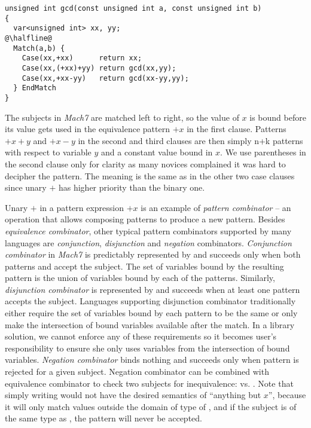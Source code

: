 \begin{lstlisting}[keepspaces,columns=flexible]
unsigned int gcd(const unsigned int a, const unsigned int b)
{
  var<unsigned int> xx, yy;
@\halfline@
  Match(a,b) {
    Case(xx,+xx)      return xx;
    Case(xx,(+xx)+yy) return gcd(xx,yy);
    Case(xx,+xx-yy)   return gcd(xx-yy,yy);
  } EndMatch
}
\end{lstlisting}

\noindent
The subjects in \emph{Mach7} are matched left to right, so the value of $x$ is 
bound before its value gets used in the equivalence pattern $+x$ in the first 
clause. Patterns $+x+y$ and $+x-y$ in the second and third clauses are then 
simply n+k patterns with respect to variable $y$ and a constant value bound in 
$x$. We use parentheses in the second clause only for clarity as many novices 
complained it was hard to decipher the pattern. The meaning is the same as in 
the other two case clauses since unary $+$ has higher priority than the binary 
one.

Unary $+$ in a pattern expression $+x$ is an example of \emph{pattern combinator} 
-- an operation that allows composing patterns to produce a new pattern. 
Besides \emph{equivalence combinator}, other typical pattern combinators 
supported by many languages are \emph{conjunction}, \emph{disjunction} and 
\emph{negation} combinators. \emph{Conjunction combinator} in \emph{Mach7} is 
predictably represented by  and succeeds only when both patterns 
 and  accept the subject. The set of variables bound by the 
resulting pattern is the union of variables bound by each of the patterns. 
Similarly, \emph{disjunction combinator} is represented by  and 
succeeds when at least one pattern accepts the subject. Languages supporting 
disjunction combinator traditionally either require the set of variables bound 
by each pattern to be the same or only make the intersection of bound variables 
available after the match. In a library solution, we cannot enforce any of these 
requirements so it becomes user's responsibility to ensure she only uses 
variables from the intersection of bound variables. \emph{Negation combinator} 
 binds nothing and succeeds only when pattern  is rejected for 
a given subject. Negation combinator can be combined with equivalence combinator 
to check two subjects for inequivalence:  vs. . Note that 
simply writing  would not have the desired semantics of ``anything but 
$x$'', because it will only match values outside the domain of type of 
, and if the subject is of the same type as , the pattern 
 will never be accepted.


